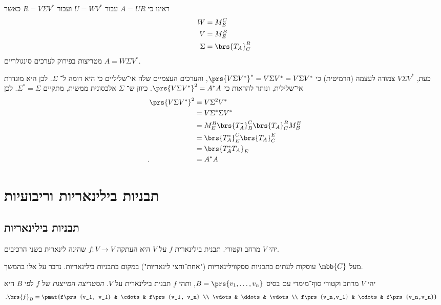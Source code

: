 \documentclass[a4paper,10pt,twoside,openany]{book}
\begin{document}
\begin{solution}
ראינו כי
$A = U R$
עבור
$U = W V^*$
ועבור
$R = V \Sigma V^*$
כאשר
\begin{align*}
W &= M^C_E \\
V &= M^B_E \\
\Sigma &= \brs{T_A}^B_C
\end{align*}
מטריצות בפירוק לערכים סינגולריים
$A = W \Sigma V^*$.

כעת,
$V \Sigma V^*$
צמודה לעצמה (הרמיטית) כי
$\prs{V \Sigma V^*}^* = V \Sigma V^* = V \Sigma V^*$,
והערכים העצמיים שלה אי־שליליים כי היא דומה ל־%
$\Sigma$.
לכן היא מוגדרת אי־שלילית, ונותר להראות כי
$\prs{V \Sigma V^*}^2 = A^* A$.
כיוון ש־%
$\Sigma$
אלכסונית ממשית, מתקיים
$\Sigma^* = \Sigma$.
לכן
\begin{align*}
\prs{V \Sigma V^*}^2 &= V \Sigma^2 V^*
\\&= V \Sigma^* \Sigma V^*
\\&= M^B_E \brs{T_A^*}^C_B \brs{T_A}^B_C M^E_B
\\&= \brs{T_A^*}^C_E \brs{T_A}^E_C
\\&= \brs{T_A^* T_A}_E
\\ \text{.} \hphantom{\prs{V \Sigma V^*}^2} &= A^* A
\end{align*}

\end{solution}

\chapter{תבניות בילינאריות וריבועיות}

\section{תבניות בילינאריות}

\begin{definition}
יהי
$V$
מרחב וקטורי. תבנית בילינארית
$f$
על
$V$
היא העתקה
$f \colon V \to V$
שהינה לינארית בשני הרכיבים.
\end{definition}

\begin{remark}
מעל
$\mbb{C}$
עוסקות לעתים בתבניות ססקווילינאריות ("אחת־וחצי לינאריות") במקום בתבניות בילינאריות. נדבר על אלו בהמשך.
\end{remark}

\begin{definition}
יהי
$V$
מרחב וקטורי סוף־מימדי עם בסיס
$B = \prs{v_1, \ldots, v_n}$,
ותהי
$f$
תבנית בילינארית על
$V$.
\emph{המטריצה המייצגת}
של
$f$
לפי
$B$
היא
\begin{align*}
\text{.} \brs{f}_B &= \pmat{f\prs{v_1, v_1} & \cdots & f\prs{v_1, v_n} \\ \vdots & \ddots & \vdots \\ f\prs{v_n,v_1} & \cdots & f\prs{v_n,v_n}}
\end{align*}
\end{definition}
\end{document}
